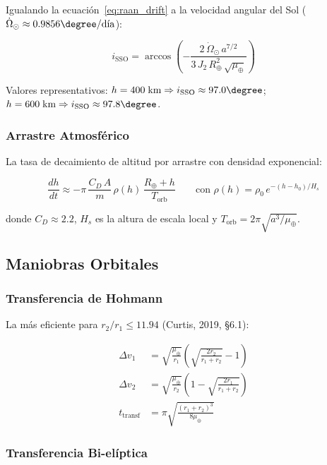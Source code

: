 \documentclass[12pt,a4paper]{article}
\newcommand{\dv}{\Delta v}
\newcommand{\RE}{R_{\oplus}}
\newcommand{\muE}{\mu_{\oplus}}
\begin{document}
Igualando la ecuaci\'on~\eqref{eq:raan_drift} a la velocidad angular del Sol ($\dot{\Omega}_\odot \approx 0.9856\degree/\text{d\'ia}$):

\begin{equation}
  i_{\text{SSO}} = \arccos\!\left(-\frac{2\,\dot{\Omega}_\odot\,a^{7/2}}%
  {3\,J_2\,\RE^2\,\sqrt{\muE}}\right)
\end{equation}

Valores representativos: $h = 400\;\text{km} \Rightarrow i_{\text{SSO}} \approx 97.0\degree$;\ \
$h = 600\;\text{km} \Rightarrow i_{\text{SSO}} \approx 97.8\degree$.

\subsubsection{Arrastre Atmosf\'erico}

La tasa de decaimiento de altitud por arrastre con densidad exponencial:

\begin{equation}
  \frac{dh}{dt} \approx -\pi\,\frac{C_D\,A}{m}\,\rho(h)\,\frac{\RE + h}{T_{\text{orb}}}
  \qquad \text{con } \rho(h) = \rho_0\,e^{-(h-h_0)/H_s}
\end{equation}

donde $C_D \approx 2.2$, $H_s$ es la altura de escala local y $T_{\text{orb}} = 2\pi\sqrt{a^3/\muE}$.

\subsection{Maniobras Orbitales}

\subsubsection{Transferencia de Hohmann}

La m\'as eficiente para $r_2/r_1 \leq 11.94$ (Curtis, 2019, \S6.1):

\begin{align}
  \dv_1 &= \sqrt{\frac{\muE}{r_1}}\left(\sqrt{\frac{2r_2}{r_1+r_2}} - 1\right) \\[4pt]
  \dv_2 &= \sqrt{\frac{\muE}{r_2}}\left(1 - \sqrt{\frac{2r_1}{r_1+r_2}}\right) \\[4pt]
  t_{\text{transf}} &= \pi\sqrt{\frac{(r_1+r_2)^3}{8\muE}}
\end{align}

\subsubsection{Transferencia Bi-el\'iptica}
\end{document}
